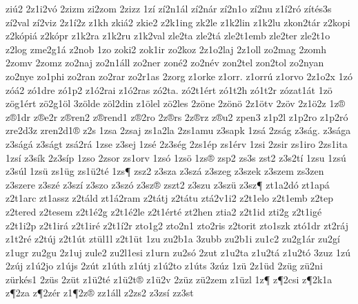 {ziú2
2z1i2vó
2zizm
zi2zom
2zizz
1zí
zí2n1ál
zí2nár
zí2n1o
zí2nu
z1í2ró
zítés3s
zí2val
zí2viz
2z1í2z
z1kh
zkiá2
zkie2
z2k1ing
zk2le
z1k2lin
z1k2lu
zkon2tár
z2kopi
z2kópiá
z2kópr
z1k2ra
z1k2ru
z1k2val
zle2ta
zle2tá
zle2t1emb
zle2ter
zle2t1o
z2log
zme2g1á
z2nob
1zo
zoki2
zok1ir
zo2koz
2z1o2laj
2z1oll
zo2mag
2zomh
2zomv
2zomz
zo2naj
zo2n1áll
zo2ner
zoné2
zo2név
zon2tel
zon2tol
zo2nyan
zo2nye
zo1phi
zo2ran
zo2rar
zo2r1as
2zorg
z1orke
z1orr.
z1orrú
z1orvo
2z1o2x
1zó
zóá2
zó1dre
zó1p2
z1ó2rai
z1ó2ras
zó2ta.
zó2t1ért
zó1t2h
zó1t2r
zózat1át
1zö
zög1ért
zö2g1öl
3zölde
zöl2din
z1ölel
zö2les
2zöne
2zönö
2z1ötv
2zöv
2z1ö2z
1z®
z®1dr
z®e2r
z®ren2
z®rend1
z®2ro
2z®rs
2z®rz
z®u2
zpen3
z1p2l
z1p2ro
z1p2ró
zre2d3z
zren2d1®
z2s
1zsa
2zsaj
zs1a2la
2zs1amu
z3sapk
1zsá
2zság
z3ság.
z3sága
z3ságá
z3ságt
zsá2rá
1zse
z3sej
1zsé
2z3ség
2zs1ép
zs1érv
1zsi
2zsir
zs1iro
2zs1ita
1zsí
z3sík
2z3síp
1zso
2zsor
zs1orv
1zsó
1zsö
1zs®
zsp2
zs3s
zst2
z3s2tí
1zsu
1zsú
z3súl
1zsü
zs1üg
zs1ü2té
1zs¶
zsz2
z3sza
z3szá
z3szeg
z3szek
z3szem
zs3zen
z3szere
z3szé
z3szí
z3szo
z3szó
z3sz®
zszt2
z3szu
z3szü
z3sz¶
zt1a2dó
zt1apá
z2t1arc
zt1assz
z2táld
zt1á2ram
z2tátj
z2tátu
ztá2v1i2
z2t1elo
z2t1emb
z2tep
z2tered
z2tesem
z2t1é2g
z2t1é2le
z2t1érté
zt2hen
ztia2
z2t1id
zti2g
z2t1igé
z2t1i2p
z2t1irá
z2t1iré
z2t1í2r
zto1g2
zto2n1
zto2ris
z2torit
zto1szk
ztó1dr
zt2ráj
z1t2ré
z2túj
z2t1út
ztül1l
z2t1üt
1zu
zu2b1a
3zubb
zu2b1i
zu1c2
zu2g1ár
zu2gí
z1ugr
zu2gu
2z1uj
zule2
zu2l1esi
z1urn
zu2só
2zut
z1u2ta
z1u2tá
z1u2tó
3zuz
1zú
2zúj
z1ú2jo
z1újs
2zút
z1úth
z1útj
z1ú2to
z1úts
3zúz
1zü
2z1üd
2züg
zü2ni
zürkés1
2züs
2züt
z1ü2té
z1ü2t®
z1ü2v
2züz
zü2zem
z1üzl
1z¶
z¶2csi
z¶2k1a
z¶2za
z¶2zér
z1¶2z®
zz1áll
z2zs2
z3zsí
zz3st
}
\endgroup
